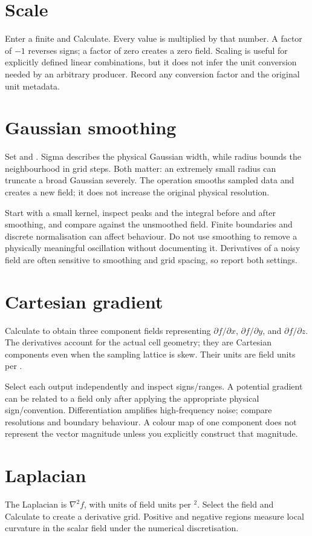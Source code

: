 \section{Scale}
Enter a finite  and Calculate. Every value is multiplied by that number. A factor of $-1$ reverses signs; a factor of zero creates a zero field. Scaling is useful for explicitly defined linear combinations, but it does not infer the unit conversion needed by an arbitrary producer. Record any conversion factor and the original unit metadata.

\section{Gaussian smoothing}
Set  and . Sigma describes the physical Gaussian width, while radius bounds the neighbourhood in grid steps. Both matter: an extremely small radius can truncate a broad Gaussian severely. The operation smooths sampled data and creates a new field; it does not increase the original physical resolution.

Start with a small kernel, inspect peaks and the integral before and after smoothing, and compare against the unsmoothed field. Finite boundaries and discrete normalisation can affect behaviour. Do not use smoothing to remove a physically meaningful oscillation without documenting it. Derivatives of a noisy field are often sensitive to smoothing and grid spacing, so report both settings.

\section{Cartesian gradient}
Calculate to obtain three component fields representing $\partial f/\partial x$, $\partial f/\partial y$, and $\partial f/\partial z$. The derivatives account for the actual cell geometry; they are Cartesian components even when the sampling lattice is skew. Their units are field units per \angstrom.

Select each output independently and inspect signs/ranges. A potential gradient can be related to a field only after applying the appropriate physical sign/convention. Differentiation amplifies high-frequency noise; compare resolutions and boundary behaviour. A colour map of one component does not represent the vector magnitude unless you explicitly construct that magnitude.

\section{Laplacian}
The Laplacian is $\nabla^2f$, with units of field units per \angstrom$^2$. Select the field and Calculate to create a derivative grid. Positive and negative regions measure local curvature in the scalar field under the numerical discretisation.

